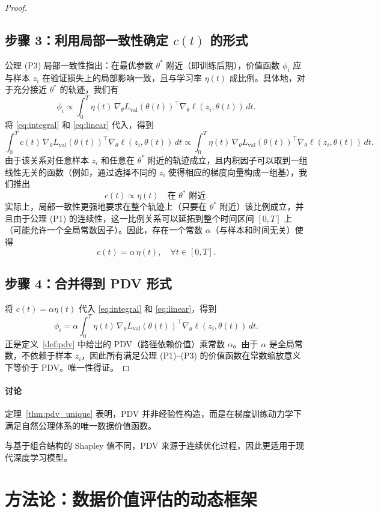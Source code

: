 \begin{proof}
\subsection*{步骤 3：利用局部一致性确定 $c(t)$ 的形式}
公理 (P3) 局部一致性指出：在最优参数 $\theta^*$ 附近（即训练后期），价值函数 $\phi_i$ 应与样本 $z_i$ 在验证损失上的局部影响一致，且与学习率 $\eta(t)$ 成比例。具体地，对于充分接近 $\theta^*$ 的轨迹，我们有
\[
\phi_i \propto \int_0^T \eta(t) \, \nabla_\theta L_{\text{val}}(\theta(t))^\top \nabla_\theta \ell(z_i, \theta(t)) \, dt.
\]
将 \eqref{eq:integral} 和 \eqref{eq:linear} 代入，得到
\[
\int_0^T c(t) \, \nabla_\theta L_{\text{val}}(\theta(t))^\top \nabla_\theta \ell(z_i, \theta(t)) \, dt
\propto \int_0^T \eta(t) \, \nabla_\theta L_{\text{val}}(\theta(t))^\top \nabla_\theta \ell(z_i, \theta(t)) \, dt.
\]
由于该关系对任意样本 $z_i$ 和任意在 $\theta^*$ 附近的轨迹成立，且内积因子可以取到一组线性无关的函数（例如，通过选择不同的 $z_i$ 使得相应的梯度向量构成一组基），我们推出
\[
c(t) \propto \eta(t) \quad \text{在 } \theta^* \text{ 附近}.
\]
实际上，局部一致性更强地要求在整个轨迹上（只要在 $\theta^*$ 附近）该比例成立，并且由于公理 (P1) 的连续性，这一比例关系可以延拓到整个时间区间 $[0,T]$ 上（可能允许一个全局常数因子）。因此，存在一个常数 $\alpha$（与样本和时间无关）使得
\[
c(t) = \alpha \, \eta(t), \quad \forall t \in [0,T].
\]

\subsection*{步骤 4：合并得到 PDV 形式}
将 $c(t) = \alpha \eta(t)$ 代入 \eqref{eq:integral} 和 \eqref{eq:linear}，得到
\[
\phi_i = \alpha \int_0^T \eta(t) \, \nabla_\theta L_{\text{val}}(\theta(t))^\top \nabla_\theta \ell(z_i, \theta(t)) \, dt.
\]
正是定义~\ref{def:pdv} 中给出的 PDV（路径依赖价值）乘常数 $\alpha$。由于 $\alpha$ 是全局常数，不依赖于样本 $z_i$，因此所有满足公理 (P1)--(P3) 的价值函数在常数缩放意义下等价于 PDV。唯一性得证。
\end{proof}

\paragraph{讨论}
定理~\ref{thm:pdv_unique} 表明，PDV 并非经验性构造，而是在梯度训练动力学下满足自然公理体系的唯一数据价值函数。

与基于组合结构的 Shapley 值不同，PDV 来源于连续优化过程，因此更适用于现代深度学习模型。

\section{方法论：数据价值评估的动态框架}

